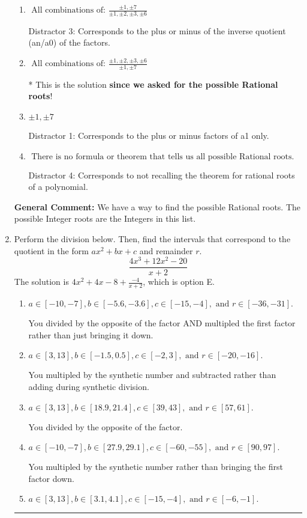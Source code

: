 \documentclass{extbook}[14pt]
\newcommand{\litem}[1]{\item #1

\rule{\textwidth}{0.4pt}}
\begin{document}
\begin{enumerate}
{\begin{enumerate}[label=\Alph*.]
This would have been the solution \textbf{if asked for the possible Integer roots}!
\item \( \text{ All combinations of: }\frac{\pm 1,\pm 7}{\pm 1,\pm 2,\pm 3,\pm 6} \)

 Distractor 3: Corresponds to the plus or minus of the inverse quotient (an/a0) of the factors. 
\item \( \text{ All combinations of: }\frac{\pm 1,\pm 2,\pm 3,\pm 6}{\pm 1,\pm 7} \)

* This is the solution \textbf{since we asked for the possible Rational roots}!
\item \( \pm 1,\pm 7 \)

 Distractor 1: Corresponds to the plus or minus factors of a1 only.
\item \( \text{ There is no formula or theorem that tells us all possible Rational roots.} \)

 Distractor 4: Corresponds to not recalling the theorem for rational roots of a polynomial.
\end{enumerate}

\textbf{General Comment:} We have a way to find the possible Rational roots. The possible Integer roots are the Integers in this list.
}
\litem{
Perform the division below. Then, find the intervals that correspond to the quotient in the form $ax^2+bx+c$ and remainder $r$.
\[ \frac{4x^{3} +12 x^{2} -20}{x + 2} \]The solution is \( 4x^{2} +4 x -8 + \frac{-4}{x + 2} \), which is option E.\begin{enumerate}[label=\Alph*.]
\item \( a \in [-10, -7], b \in [-5.6, -3.6], c \in [-15, -4], \text{ and } r \in [-36, -31]. \)

 You divided by the opposite of the factor AND multipled the first factor rather than just bringing it down.
\item \( a \in [3, 13], b \in [-1.5, 0.5], c \in [-2, 3], \text{ and } r \in [-20, -16]. \)

 You multipled by the synthetic number and subtracted rather than adding during synthetic division.
\item \( a \in [3, 13], b \in [18.9, 21.4], c \in [39, 43], \text{ and } r \in [57, 61]. \)

 You divided by the opposite of the factor.
\item \( a \in [-10, -7], b \in [27.9, 29.1], c \in [-60, -55], \text{ and } r \in [90, 97]. \)

 You multipled by the synthetic number rather than bringing the first factor down.
\item \( a \in [3, 13], b \in [3.1, 4.1], c \in [-15, -4], \text{ and } r \in [-6, -1]. \)


\end{enumerate}}
\end{enumerate}
\end{document}
